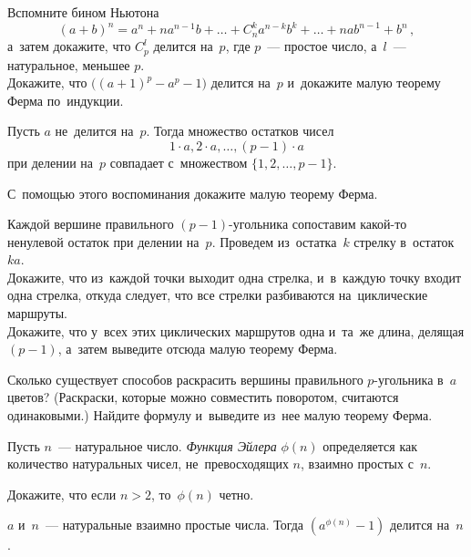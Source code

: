 \begin{problems}

\item
\subproblem
Вспомните бином Ньютона
\[
    (a + b)^n
=
    a^n + n a^{n-1} b +
    \ldots +
    C_n^k a^{n-k} b^k +
    \ldots +
    n a b^{n-1} + b^n
\,,\] а~затем докажите, что $C_p^l$ делится на~$p$, где $p$~--- простое число,
а~$l$~--- натуральное, меньшее $p$.
\\
\subproblem
Докажите, что $\bigl( (a + 1)^p - a^p - 1 \bigr)$ делится на~$p$ и~докажите
малую теорему Ферма по~индукции.

\item
\label{algebra/number-theory/fermats-theorem-g8r1:problem:fermat-proof-1}%
Пусть $a$ не~делится на~$p$.
Тогда множество остатков чисел
\[
    1 \cdot a, 2 \cdot a, \ldots, (p - 1) \cdot a
\]
при делении на~$p$ совпадает с~множеством $\{ 1, 2, \ldots, p - 1 \}$.
\par
С~помощью этого воспоминания докажите малую теорему Ферма.

\item
\label{algebra/number-theory/fermats-theorem-g8r1:problem:fermat-proof-2}%
Каждой вершине правильного $(p - 1)$-угольника сопоставим какой-то ненулевой
остаток при делении на~$p$.
Проведем из~остатка~$k$ стрелку в~остаток~$k a$.
\\
\subproblem
Докажите, что из~каждой точки выходит одна стрелка, и~в~каждую точку входит
одна стрелка, откуда следует, что все стрелки разбиваются на~циклические
маршруты.
\\
\subproblem
Докажите, что у~всех этих циклических маршрутов одна и~та~же длина, делящая
$(p - 1)$, а~затем выведите отсюда малую теорему Ферма.

\item
Сколько существует способов раскрасить вершины правильного $p$-угольника
в~$a$ цветов?
(Раскраски, которые можно совместить поворотом, считаются одинаковыми.)
Найдите формулу и~выведите из~нее малую теорему Ферма.

\end{problems}

Пусть $n$~--- натуральное число.
\emph{Функция Эйлера} $\phi(n)$ определяется как количество натуральных чисел,
не~превосходящих $n$, взаимно простых с~$n$.

Докажите, что если $n > 2$, то~$\phi(n)$ четно.

$a$ и~$n$~--- натуральные взаимно простые числа.
Тогда $(a^{\phi(n)} - 1)$ делится на~$n$.

